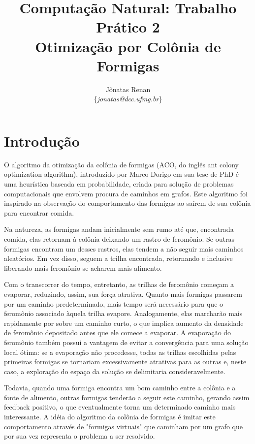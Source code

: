 \documentclass{article}
\begin{document}
\title{Computação Natural: Trabalho Prático 2 \\
\large Otimização por Colônia de Formigas}
\author{Jônatas Renan \\
\{\textit{jonatas@dcc.ufmg.br}\}}
\maketitle

\section{Introdução}

\par
O algoritmo da otimização da colônia de formigas (ACO, do inglês ant colony optimization algorithm), introduzido por Marco Dorigo em sua tese de PhD é uma heurística baseada em probabilidade, criada para solução de problemas computacionais que envolvem procura de caminhos em grafos. Este algoritmo foi inspirado na observação do comportamento das formigas ao saírem de sua colônia para encontrar comida.
\newline
\par
Na natureza, as formigas andam inicialmente sem rumo até que, encontrada comida, elas retornam à colônia deixando um rastro de feromônio. Se outras formigas encontram um desses rastros, elas tendem a não seguir mais caminhos aleatórios. Em vez disso, seguem a trilha encontrada, retornando e inclusive liberando mais feromônio se acharem mais alimento.
\newline
\par
Com o transcorrer do tempo, entretanto, as trilhas de feromônio começam a evaporar, reduzindo, assim, sua força atrativa. Quanto mais formigas passarem por um caminho predeterminado, mais tempo será necessário para que o feromônio associado àquela trilha evapore. Analogamente, elas marcharão mais rapidamente por sobre um caminho curto, o que implica aumento da densidade de feromônio depositado antes que ele comece a evaporar. A evaporação do feromônio também possui a vantagem de evitar a convergência para uma solução local ótima: se a evaporação não procedesse, todas as trilhas escolhidas pelas primeiras formigas se tornariam excessivamente atrativas para as outras e, neste caso, a exploração do espaço da solução se delimitaria consideravelmente.
\newline
\par
Todavia, quando uma formiga encontra um bom caminho entre a colônia e a fonte de alimento, outras formigas tenderão a seguir este caminho, gerando assim feedback positivo, o que eventualmente torna um determinado caminho mais interessante. A idéia do algoritmo da colônia de formigas é imitar este comportamento através de "formigas virtuais" que caminham por um grafo que por sua vez representa o problema a ser resolvido.
\end{document}
